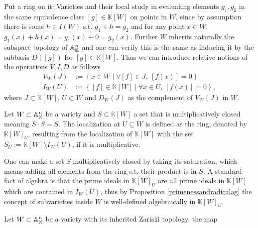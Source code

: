 \begin{subsection}{Put a ring on it: Varieties and their local study}
    in evaluating elements \( g_1, g_2 \) in the same equivalence class \( [g] \in \mathbb{K}[W] \) on points in \( W \), since by assumption there
    is some \( h \in I(W) \) s.t. \( g_1 + h = g_2 \) and for any point \( x \in W \), \( g_1(x) + h(x) = g_1(x) + 0 = g_2(x) \).
    Further \( W \) inherits naturally the subspace topology of \( \mathbb{A}^{n}_{\mathbb{K}} \) and one can verify this is the same as inducing it by the subbasis \( D([g]) \)
    for \( [g] \in \mathbb{K}[W] \). Thus we can introduce relative notions of the operations \( V, I, D \) as follows 
    \begin{align*}
        V_{W}(J) &:= \left\{ x \in W \mid \forall [f] \in J,\ [f(x)] = 0 \right\}  \\
        I_{W}(U) &:= \left\{ [f] \in \mathbb{K}[W] \mid \forall x \in U,\ [f(x)] = 0 \right\},
    \end{align*}
    where \( J \subset \mathbb{K}[W] \), \( U \subset W \) and \( D_W(J) \) as the complement of \( V_{W}(J) \) in \( W \).
    \begin{definition}
        Let \( W \subset \mathbb{A}^{n}_{\mathbb{K}} \) be a variety and  \( S \subset \mathbb{K}[W] \) a set that is multiplicatively closed meaning \( S \cdot S = S \).
        The localization at \( U \subseteq W \) is defined as the ring, denoted by \( \mathbb{K}[W]_{U} \), resulting from the localization of \( \mathbb{K}[W] \) 
        with the set \( S_U := \mathbb{K}[W] \setminus I_{W}(U) \), if it is multiplicative.
    \end{definition}
    One can make a set \( S \) multiplicatively closed by taking its saturation, which means adding all elements from the ring s.t. their product is in \( S \).
    A standard fact of algebra is that the prime ideals in \( \mathbb{K}[W]_{U} \) are all prime ideals in \( \mathbb{K}[W] \) which are contained in \( I_W(U) \),
    thus by Proposition \ref{primenessandradicalag} the concept of subvarieties inside \( W \) is well-defined algebraically in \( \mathbb{K}[W]_{U} \).
    \begin{theorem} \label{sheafofvariety}
        Let \( W \subset \mathbb{A}^{n}_{\mathbb{K}} \) be a variety with its inherited Zariski topology, the map 
        \begin{align*}

\end{align*}
\end{theorem}
\end{subsection}
